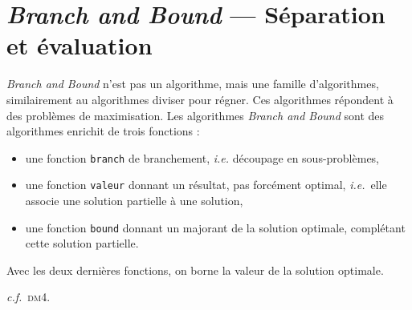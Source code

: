 \section{\textit{Branch and Bound} --- Séparation et évaluation}
\textit{Branch and Bound} n'est pas un algorithme, mais une famille d'algorithmes, similairement au algorithmes diviser pour régner.
Ces algorithmes répondent à des problèmes de maximisation.
Les algorithmes \textit{Branch and Bound} sont des algorithmes enrichit de trois fonctions :
\begin{itemize}
	\item une fonction \texttt{branch} de branchement, \textit{i.e.} découpage en sous-problèmes,
	\item une fonction \texttt{valeur} donnant un résultat, pas forcément optimal, \textit{i.e.}\ elle associe une solution partielle à une solution,
	\item une fonction \texttt{bound} donnant un majorant de la solution optimale, complétant cette solution partielle.
\end{itemize}
Avec les deux dernières fonctions, on borne la valeur de la solution optimale.

\begin{exm}
	\textit{c.f.}\ \textsc{dm4}.
\end{exm}

